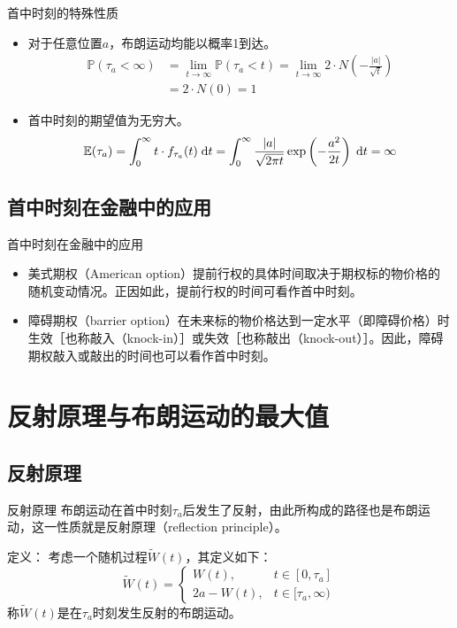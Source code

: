 \documentclass[t]{beamer}
\newcommand{\dif}{{\;\rm d}}
\renewcommand{\Pr}{\mathbb{P}}
\newcommand{\E}{\mathbb{E}}
\begin{document}
\begin{frame}{首中时刻的特殊性质}
  \begin{itemize}
    \item   对于任意位置$a$，布朗运动均能以概率1到达。
     \begin{equation*}
      \begin{split}
      \Pr(\tau_a<\infty)&=\lim_{t\to\infty}\Pr(\tau_a<t)=\lim_{t\to\infty}2\cdot N\left(-\frac{|a|}{\sqrt{t}}\right)\\
      &=2\cdot N(0)=1
      \end{split}
      \end{equation*}
    \item 首中时刻的期望值为无穷大。
    \begin{equation*}
      \E(\tau_a)=\int_{0}^{\infty} t\cdot f_{\tau_a}(t)\dif t=\int_{0}^{\infty} \frac{|a|}{\sqrt{2\pi t}}\exp\left(-\frac{a^2}{2t}\right)\dif t=\infty
      \end{equation*}
  \end{itemize}
\end{frame}

\subsection{首中时刻在金融中的应用}
\begin{frame}{首中时刻在金融中的应用}
    \begin{itemize}
      \item 美式期权（American option）提前行权的具体时间取决于期权标的物价格的随机变动情况。正因如此，提前行权的时间可看作首中时刻。
      \item 障碍期权（barrier option）在未来标的物价格达到一定水平（即障碍价格）时生效［也称敲入（knock-in）］或失效［也称敲出（knock-out）］。因此，障碍期权敲入或敲出的时间也可以看作首中时刻。
    \end{itemize}
\end{frame}

\section{反射原理与布朗运动的最大值}
\subsection{反射原理}
\begin{frame}{反射原理}
  布朗运动在首中时刻$\tau_a$后发生了反射，由此所构成的路径也是布朗运动，这一性质就是反射原理（reflection principle）。


  \begin{block}{定义：}
    考虑一个随机过程$\widetilde W(t)$，其定义如下：
	\begin{equation*}
	\widetilde W(t)=\begin{cases}
	W(t),& t\in[0,\tau_a]\\
	2a-W(t),& t\in[\tau_a,\infty)
	\end{cases}
	\end{equation*}
称$\widetilde W(t)$是在$\tau_a$时刻发生反射的布朗运动。
  \end{block}
\end{frame}
\end{document}
